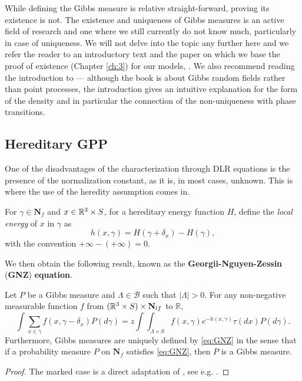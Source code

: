 While defining the Gibbs measure is relative straight-forward, proving its existence is not. The existence and uniqueness of Gibbs measures is an active field of research and one where we still currently do not know much, particularly in case of uniqueness.  We will not delve into the topic any further here and we refer the reader to an introductory text \cite{Dereudre2017} and the paper on which we base the proof of existence (Chapter \ref{ch:3}) for our models, \cite{DDG12}. We also recommend reading the introduction to \cite{Georgii2011} --- although the book is about Gibbs random fields rather than point processes, the introduction gives an intuitive explanation for the form of the density and in particular the connection of the non-uniqueness with phase transitions.

\subsection{Hereditary GPP}
One of the disadvantages of the characterization through DLR equations is the presence of the normalization constant, as it is, in most cases, unknown. This is where the use of the heredity assumption comes in.

For $\gamma \in \mathbf N_f$ and $x \in {\mathbb R^3}\times S$, for a hereditary energy function $H$, define the \textit{local energy} of $x$ in $\gamma$ as
$$h(x,\gamma) = H(\gamma + \delta_x) - H(\gamma),$$
with the convention $+\infty - (+\infty) = 0$. 

We then obtain the following result, known as the \textbf{Georgii-Nguyen-Zessin }(\textbf{GNZ}) \textbf{equation}. 

\begin{proposition} Let $P$ be a Gibbs measure and $\Lambda \in \mathcal B$ such that $|\Lambda|>0$. For any non-negative measurable function $f$ from $({\mathbb R^3}\times S)\times \mathbf N_{lf}$ to $\mathbb R$,
	\begin{equation}\label{eq:GNZ}\int \sum_{x \in \gamma} f(x,\gamma- \delta_x) P(d\gamma) = z \int \int_{\Lambda\times S} f(x,\gamma) e^{-h(x,\gamma)} \tau(dx) P (d\gamma).\end{equation}
	Furthermore, Gibbs measures are uniquely defined by \eqref{eq:GNZ} in the sense that if a probability measure $P$ on $\mathbf N_f$ satisfies \eqref{eq:GNZ}, then $P$ is a Gibbs measure.
\end{proposition}
\begin{proof}
	The marked case is a direct adaptation of \cite{NguyenZessin1979}, see e.g. \cite{Mase2000}.		
\end{proof}

